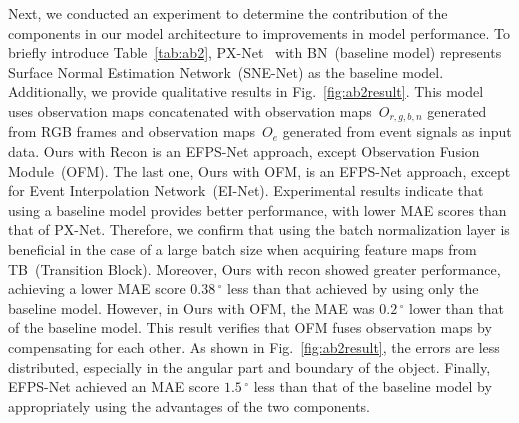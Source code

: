 Next, we conducted an experiment to determine the contribution of the components in our model architecture to improvements in model performance. To briefly introduce Table~\ref{tab:ab2}, PX-Net~\citep{logothetis2021px} with BN~(baseline model) represents Surface Normal Estimation Network~(SNE-Net) as the baseline model. Additionally, we provide qualitative results in Fig.~\ref{fig:ab2result}. This model uses observation maps concatenated with observation maps~$O_{r,g,b,n}$ generated from RGB frames and observation maps~$O_{e}$ generated from event signals as input data. Ours with Recon is an EFPS-Net approach, except Observation Fusion Module~(OFM). The last one, Ours with OFM, is an EFPS-Net approach, except for Event Interpolation Network~(EI-Net). Experimental results indicate that using a baseline model provides better performance, with lower MAE scores than that of PX-Net. Therefore, we confirm that using the batch normalization layer is beneficial in the case of a large batch size when acquiring feature maps from TB~(Transition Block). Moreover, Ours with recon showed greater performance, achieving a lower MAE score $0.38\,^{\circ}$ less than that achieved by using only the baseline model. However, in Ours with OFM, the MAE was $0.2\,^{\circ}$ lower than that of the baseline model. This result verifies that OFM fuses observation maps by compensating for each other. As shown in Fig.~\ref{fig:ab2result}, the errors are less distributed, especially in the angular part and boundary of the object. Finally, EFPS-Net achieved an MAE score $1.5\,^{\circ}$ less than that of the baseline model by appropriately using the advantages of the two components.